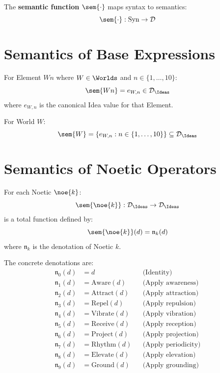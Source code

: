 \begin{definition}
\label{def:sem-function}
The \textbf{semantic function} $\sem{\cdot}$ maps syntax to semantics:
\[
\sem{\cdot} : \mathrm{Syn} \to \mathcal{D}
\]
\end{definition}

\section{Semantics of Base Expressions}

\begin{definition}
\label{def:elem-sem}
For Element $Wn$ where $W \in \Worlds$ and $n \in \{1,\ldots,10\}$:
\[
\sem{Wn} = e_{W,n} \in \mathcal{D}_\Ideas
\]
where $e_{W,n}$ is the canonical Idea value for that Element.
\end{definition}

\begin{definition}
\label{def:world-sem}
For World $W$:
\[
\sem{W} = \{e_{W,n} : n \in \{1,\ldots,10\}\} \subseteq \mathcal{D}_\Ideas
\]
\end{definition}

\section{Semantics of Noetic Operators}

\begin{definition}
\label{def:noetic-sem}
For each Noetic $\noe{k}$:
\[
\sem{\noe{k}} : \mathcal{D}_\Ideas \to \mathcal{D}_\Ideas
\]
is a total function defined by:
\[
\sem{\noe{k}}(d) = \mathfrak{n}_k(d)
\]
where $\mathfrak{n}_k$ is the denotation of Noetic $k$.
\end{definition}

\begin{definition}
\label{def:noetic-denote}
The concrete denotations are:
\begin{align}
\mathfrak{n}_0(d) &= d && \text{(Identity)} \\
\mathfrak{n}_1(d) &= \mathrm{Aware}(d) && \text{(Apply awareness)} \\
\mathfrak{n}_2(d) &= \mathrm{Attract}(d) && \text{(Apply attraction)} \\
\mathfrak{n}_3(d) &= \mathrm{Repel}(d) && \text{(Apply repulsion)} \\
\mathfrak{n}_4(d) &= \mathrm{Vibrate}(d) && \text{(Apply vibration)} \\
\mathfrak{n}_5(d) &= \mathrm{Receive}(d) && \text{(Apply reception)} \\
\mathfrak{n}_6(d) &= \mathrm{Project}(d) && \text{(Apply projection)} \\
\mathfrak{n}_7(d) &= \mathrm{Rhythm}(d) && \text{(Apply periodicity)} \\
\mathfrak{n}_8(d) &= \mathrm{Elevate}(d) && \text{(Apply elevation)} \\
\mathfrak{n}_9(d) &= \mathrm{Ground}(d) && \text{(Apply grounding)}
\end{align}
\end{definition}

